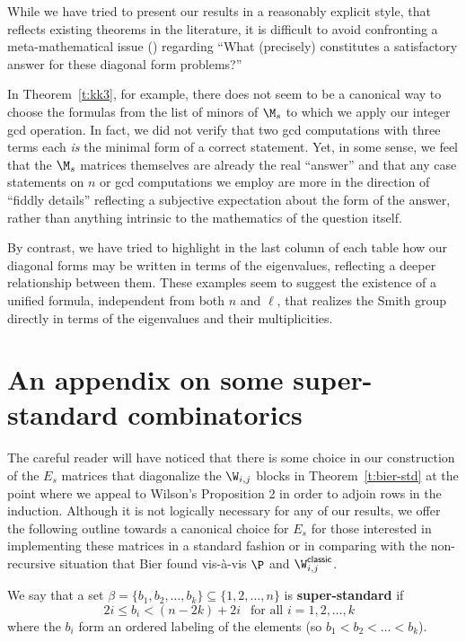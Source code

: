 \bigskip
While we have tried to present our results in a reasonably explicit style, that reflects existing theorems in the literature, it is difficult to avoid confronting a meta-mathematical issue (\eg \cite{wilf}) regarding ``What (precisely) constitutes a satisfactory answer for these diagonal form problems?''  

In Theorem~\ref{t:kk3}, for example, there does not seem to be a canonical way to choose the formulas from the list of minors of $\M_s$ to which we apply our integer gcd operation.  In fact, we did not verify that two gcd computations with three terms each {\em is} the minimal form of a correct statement.  Yet, in some sense, we feel that the $\M_s$ matrices themselves are already the real ``answer'' and that any case statements on $n$ or gcd computations we employ are more in the direction of ``fiddly details'' reflecting a subjective expectation about the form of the answer, rather than anything intrinsic to the mathematics of the question itself.

By contrast, we have tried to highlight in the last column of each table how our diagonal forms may be written in terms of the eigenvalues, reflecting a deeper relationship between them.  These examples seem to suggest the existence of a unified formula, independent from both $n$ and $\ell$, that realizes the Smith group directly in terms of the eigenvalues and their multiplicities.


\appendix
\section*{An appendix on some super-standard combinatorics}
\setcounter{section}{5}
\setcounter{cdrthm}{0}
\setlength{\arraycolsep}{1.5pt}
\setcounter{MaxMatrixCols}{99}

The careful reader will have noticed that there is some choice in our construction of the $E_s$ matrices that diagonalize the $\W_{i,j}$ blocks in Theorem~\ref{t:bier-std} at the point where we appeal to Wilson's Proposition 2 in order to adjoin rows in the induction.  Although it is not logically necessary for any of our results, we offer the following outline towards a canonical choice for $E_s$ for those interested in implementing these matrices in a standard fashion or in comparing with the non-recursive situation that Bier found vis-\`a-vis $\P$ and $\W_{i,j}^{\mathsf{classic}}$.

\begin{definition}
We say that a set $\beta = \{b_1, b_2, \ldots, b_k\} \subseteq \{1, 2, \ldots, n\}$ is {\bf super-standard} if 
\[ 2i \leq b_i < (n-2k) + 2i \ \ \text{ for all $i = 1, 2, \ldots, k$ } \]
where the $b_i$ form an ordered labeling of the elements (so $b_1 < b_2 < \ldots < b_k$).
\end{definition}

